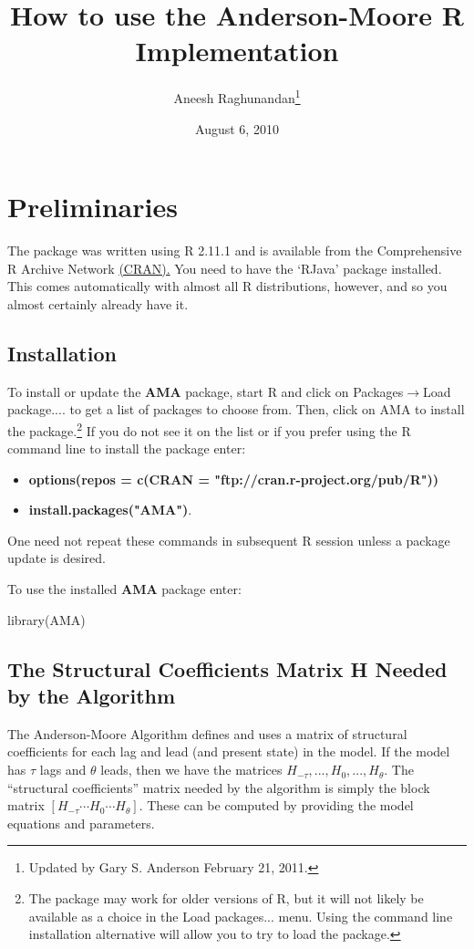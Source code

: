 \documentclass[12pt]{article}
\title{How to use the Anderson-Moore  R Implementation}
\author{Aneesh Raghunandan\thanks{Updated by Gary S. Anderson February 21, 2011.}}
\date{August 6, 2010  }
\begin{document}
\maketitle
\section{Preliminaries} 


The package was written using R 2.11.1 and is available from the Comprehensive
 R Archive Network \href{http://cran.r-project.org/}{(CRAN).}
You need to have the `RJava' package installed. This comes automatically with almost all R distributions, however, and so you almost certainly already have it.
\subsection{Installation}


To install or update the {\bf AMA} package, start R and click on Packages$\rightarrow$Load package....  to get a list of packages to choose from.  Then, click
on AMA to install the package.\footnote{The package may work for older versions of R, but
it will not likely be available as a choice in the Load packages...  menu.
Using the command line installation alternative 
will allow you to try to load the package.}  If you do not see it on the list or if you prefer using the
R command line to install the package enter:
\begin{itemize}
\item {\bf options(repos = c(CRAN = "ftp://cran.r-project.org/pub/R")) }
\item {\bf install.packages("AMA")}. 
\end{itemize}

One need not repeat these commands in subsequent R session unless a package
update is desired.

\vspace{0.15in}

To use the installed {\bf AMA} package enter:

library(AMA)





\subsection{The Structural Coefficients Matrix H Needed by the Algorithm}
The Anderson-Moore Algorithm defines and uses a matrix of structural coefficients for each lag and lead (and present state) in the model.  If the model has $\tau$ lags and $\theta$ leads, then we have the matrices $H_{-\tau},...,H_0, ...,H_{\theta}$.  The ``structural coefficients'' matrix needed by the algorithm is simply the block matrix $\left[H_{-\tau}\cdots H_0 \cdots H_{\theta} \right] $.  These can be computed by providing the model equations and parameters.%
\end{document}
